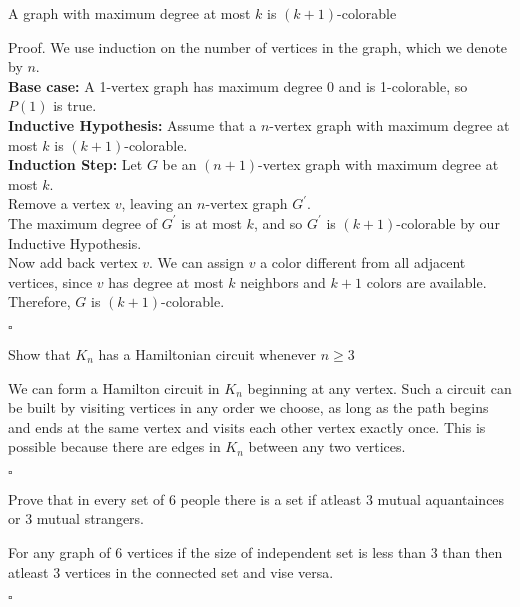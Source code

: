 \documentclass{exam}
\begin{document}
\begin{questions}
    \question A graph with maximum degree at most $k$ is $(k+1)$-colorable
    \begin{solution}
        Proof. We use induction on the number of vertices in the graph, which we denote by $n$. 
        \\\textbf{Base case:} A 1-vertex graph has maximum degree 0 and is 1-colorable, so $P(1)$ is true. 
        \\\textbf{Inductive Hypothesis:} Assume that a $n$-vertex graph with maximum degree at most $k$ is $(k+1)$-colorable.
        \\\textbf{Induction Step:} Let $G$ be an $(n+1)$-vertex graph with maximum degree at most $k$. 
        \\Remove a vertex $v$, leaving an $n$-vertex graph $G^{\prime}$. 
        \\The maximum degree of $G^{\prime}$ is at most $k$, and so $G^{\prime}$ is $(k+1)$-colorable by our Inductive Hypothesis. 
        \\Now add back vertex $v$. We can assign $v$ a color different from all adjacent vertices, since $v$ has degree at most $k$ neighbors and $k+1$ colors are available. 
        \\Therefore, $G$ is $(k+1)$-colorable. 
        \begin{flushright}
            $\square$
        \end{flushright}
    \end{solution}

    \question Show that $K_n$ has a Hamiltonian circuit whenever $n\geq 3$
    \begin{solution}
        We can form a Hamilton circuit in $K_n$ beginning at any vertex. Such a circuit can be
        built by visiting vertices in any order we choose, as long as the path begins and ends at the same
        vertex and visits each other vertex exactly once. This is possible because there are edges in $K_n$
        between any two vertices.
        \begin{flushright}
            $\square$
        \end{flushright}
    \end{solution}

    \question Prove that in every set of 6 people there is a set if atleast 3 mutual aquantainces or 3 mutual strangers.
    \begin{solution}
        For any graph of 6 vertices if the size of independent set is less than 3 than then atleast 3 vertices in the connected set and vise versa.
        \begin{flushright}
            $\square$
        \end{flushright}
    \end{solution}


\end{questions}
\end{document}
